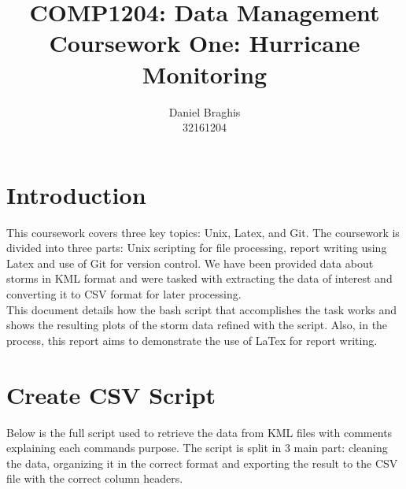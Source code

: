 \documentclass[]{article}
\begin{document}
\title{COMP1204: Data Management \\ Coursework One: Hurricane Monitoring }
\author{Daniel Braghis \\ 32161204}
\maketitle

\section{Introduction}
This coursework covers three key topics: Unix, Latex, and Git. The coursework is divided into three parts: Unix scripting for file processing, report writing using Latex and use of Git for version control. We have been provided data about storms in KML format and were tasked with extracting the data of interest and converting it to CSV format for later processing.\\ This document details how the bash script that accomplishes the task works and shows the resulting plots of the storm data refined with the script. Also, in the process, this report aims to demonstrate the use of LaTex for report writing.

\section{Create CSV Script}
Below is the full script used to retrieve the data from KML files with comments explaining each commands purpose. The script is split in 3 main part: cleaning the data, organizing it in the correct format and exporting the result to the CSV file with the correct column headers.\\
\end{document}
